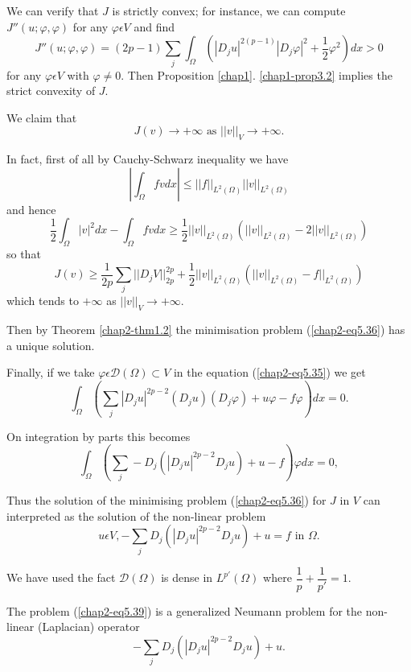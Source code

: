 We can verify that $J$ is strictly convex; for instance, we can compute $J''(u ; \varphi, \varphi)$ for any $\varphi \epsilon V$ and find
\begin{equation*}
J''(u ; \varphi, \varphi) = (2p - 1) \sum_{j} \int_{\Omega} (|D_{j} u|^{2(p-1)} |D_{j} \varphi|^{2} + \frac{1}{2} \varphi^{2})dx > 0\tag{5.38}\label{chap2-eq5.38}
\end{equation*}
for any $\varphi \epsilon V$ with $\varphi \neq 0$. Then Proposition \ref{chap1}. \ref{chap1-prop3.2} implies the strict convexity of $J$.

We claim that
$$
J(v) \to + \infty \text{ as } ||v||_{V} \to + \infty.
$$

In fact, first of all by Cauchy-Schwarz inequality we have
$$
\left|\int_{\Omega} fv dx\right| \leq ||f||_{L^{2} (\Omega)} ||v||_{L^{2} (\Omega)}
$$
and hence
$$
\frac{1}{2} \int_{\Omega} |v|^{2} dx - \int_{\Omega} fv dx \geq \frac{1}{2} ||v||_{L^{2} (\Omega)} (||v||_{L^{2} (\Omega)} - 2||v||_{L^{2} (\Omega)})
$$
so that
$$
J(v) \geq \dfrac{1}{2p} \sum_{j} ||D_{j} V||_{2p}^{2p} + \frac{1}{2} ||v||_{L^{2} (\Omega)} (||v||_{L^{2} (\Omega)} - f ||_{L^{2} (\Omega)} )
$$\pageoriginale
which tends to $+ \infty$ as $||v||_{V} \to +\infty$.

Then by Theorem \ref{chap2-thm1.2} the minimisation problem (\ref{chap2-eq5.36}) has a unique solution.

Finally, if we take $\varphi \epsilon \mathscr{D} (\Omega) \subset V$ in the equation (\ref{chap2-eq5.35}) we get
$$
\int_{\Omega} (\sum_{j} |D_{j} u|^{2p-2} (D_{j}u) (D_{j} \varphi) + u \varphi - f\varphi) dx = 0.
$$

On integration by parts this becomes
$$
\int_{\Omega} (\sum_{j} - D_{j} (|D_{j} u|^{2p-2} D_{j}u) + u-f) \varphi dx = 0,
$$

Thus the solution of the minimising problem (\ref{chap2-eq5.36}) for $J$ in $V$ can interpreted as the solution of the non-linear problem
\begin{equation*}
u \epsilon V, -\sum_{j} D_{j} (|D_{j} u|^{2p-2} D_{j}u) + u = f \text{ in } \Omega.\tag{5.39}\label{chap2-eq5.39}
\end{equation*}

We have used the fact $\mathscr{D} (\Omega)$ is dense in $L^{p'} (\Omega)$ where $\dfrac{1}{p} + \dfrac{1}{p'} = 1$.

The problem (\ref{chap2-eq5.39}) is a generalized Neumann problem for the non-linear (Laplacian) operator
\begin{equation*}
-\sum_{j} D_{j} (|D_{j} u|^{2p-2} D_{j}u) + u.\tag{5.40}\label{chap2-eq5.40}
\end{equation*}

